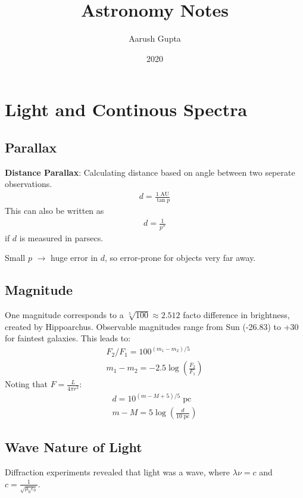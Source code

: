 \documentclass[12pt]{article}
\title{Astronomy Notes}
\author{Aarush Gupta}
\date{2020}
\begin{document}
\maketitle

\tableofcontents

\newpage

\section{Light and Continous Spectra}

\subsection{Parallax}

\textbf{Distance Parallax}: Calculating distance based on angle between two seperate observations.
\begin{align*}
    d = \frac{1\;\text{AU}}{\tan{p}}
\end{align*}
This can also be written as
\begin{align*}
    d = \frac{1}{p''}
\end{align*}
if $d$ is measured in parsecs.

Small $p$ $\to$ huge error in $d$, so error-prone for objects very far away.

\subsection{Magnitude}

One magnitude corresponds to a $\sqrt[5]{100} \approx 2.512$ facto difference in brightness, created by Hippoarchus. Observable magnitudes range from Sun (-26.83) to +30 for faintest galaxies. This leads to:
\begin{align*}
    F_2/F_1 = 100^{(m_1 - m_2)/5} \\
    m_1 - m_2 = -2.5\log{\left(\frac{F_2}{F_1}\right)}
\end{align*}
Noting that $F = \frac{L}{4\pi r^2}$:
\begin{align*}
    d = 10^{(m - M + 5)/5}\;\text{pc} \\
    m - M = 5\log{\left(\frac{d}{10\;\text{pc}}\right)}
\end{align*} 

\subsection{Wave Nature of Light}
Diffraction experiments revealed that light was a wave, where $\lambda\nu = c$ and $c = \frac{1}{\sqrt{\mu_0\varepsilon_0}}$.
\end{document}
